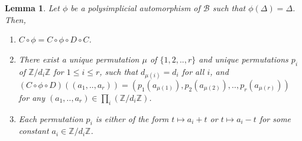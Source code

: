 \documentclass{amsart}
\theoremstyle{theorem}
\theoremstyle{lemma}
\newtheorem{lemma}{Lemma}[section]
\theoremstyle{prop}
\theoremstyle{definition}
\theoremstyle{corollary}
\theoremstyle{remark}
\newcommand{\Z}{\mathbb{Z}}
\newcommand{\B}{\mathcal{B}}
\begin{document}
\begin{lemma} \label{lem:color}
Let $\phi$ be a polysimplicial automorphism of $\B$ such that $\phi(\Delta)=\Delta$. Then, 
\begin{enumerate}
\item
$C \circ \phi = C \circ \phi \circ D \circ C$.
\item
There exist a unique permutation $\mu$ of $\{1,2,..,r\}$ and unique permutations $p_i$ of $\Z/d_i\Z$ for $1\leq i \leq r$, such that $d_{\mu(i)}=d_i$  for all $i$, and $(C \circ \phi \circ D)((a_1,..,a_r))=(p_1(a_{\mu(1)}),p_2(a_{\mu(2)}),..,p_r(a_{\mu(r)}))$ for any $(a_1,..,a_r) \in \prod_i(\Z/d_i\Z)$.
\item
Each permutation $p_i$ is either of the form $t \mapsto a_i+t$ or $t \mapsto a_i-t$ for some constant $a_i\in \Z/d_i\Z$.
\end{enumerate}
\end{lemma}
\end{document}
